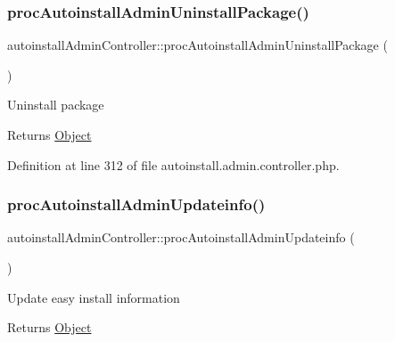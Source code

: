 \hypertarget{classautoinstallAdminController_af289464bb0d9238e82962bd5ce74076f}{}\label{classautoinstallAdminController_af289464bb0d9238e82962bd5ce74076f} 
\subsubsection{\texorpdfstring{proc\+Autoinstall\+Admin\+Uninstall\+Package()}{procAutoinstallAdminUninstallPackage()}}
{\footnotesize\ttfamily autoinstall\+Admin\+Controller\+::proc\+Autoinstall\+Admin\+Uninstall\+Package (\begin{DoxyParamCaption}{ }\end{DoxyParamCaption})}

Uninstall package

\begin{DoxyReturn}{Returns}
\hyperlink{classObject}{Object} 
\end{DoxyReturn}


Definition at line 312 of file autoinstall.\+admin.\+controller.\+php.

\hypertarget{classautoinstallAdminController_ac498f2779268ea03dd40799c72af90de}{}\label{classautoinstallAdminController_ac498f2779268ea03dd40799c72af90de} 
\subsubsection{\texorpdfstring{proc\+Autoinstall\+Admin\+Updateinfo()}{procAutoinstallAdminUpdateinfo()}}
{\footnotesize\ttfamily autoinstall\+Admin\+Controller\+::proc\+Autoinstall\+Admin\+Updateinfo (\begin{DoxyParamCaption}{ }\end{DoxyParamCaption})}

Update easy install information

\begin{DoxyReturn}{Returns}
\hyperlink{classObject}{Object} 
\end{DoxyReturn}


